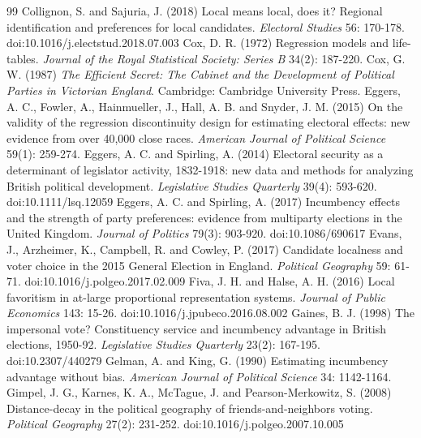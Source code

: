 \documentclass[11pt,a4paper]{article}
\begin{document}
\begin{thebibliography}{99}
 Collignon, S. and Sajuria, J. (2018) Local means local, does it? Regional identification and preferences for local candidates. \textit{Electoral Studies} 56: 170-178. doi:10.1016/j.electstud.2018.07.003
 Cox, D. R. (1972) Regression models and life-tables. \textit{Journal of the Royal Statistical Society: Series B} 34(2): 187-220.
 Cox, G. W. (1987) \textit{The Efficient Secret: The Cabinet and the Development of Political Parties in Victorian England}. Cambridge: Cambridge University Press.
 Eggers, A. C., Fowler, A., Hainmueller, J., Hall, A. B. and Snyder, J. M. (2015) On the validity of the regression discontinuity design for estimating electoral effects: new evidence from over 40,000 close races. \textit{American Journal of Political Science} 59(1): 259-274.
 Eggers, A. C. and Spirling, A. (2014) Electoral security as a determinant of legislator activity, 1832-1918: new data and methods for analyzing British political development. \textit{Legislative Studies Quarterly} 39(4): 593-620. doi:10.1111/lsq.12059
 Eggers, A. C. and Spirling, A. (2017) Incumbency effects and the strength of party preferences: evidence from multiparty elections in the United Kingdom. \textit{Journal of Politics} 79(3): 903-920. doi:10.1086/690617
 Evans, J., Arzheimer, K., Campbell, R. and Cowley, P. (2017) Candidate localness and voter choice in the 2015 General Election in England. \textit{Political Geography} 59: 61-71. doi:10.1016/j.polgeo.2017.02.009
 Fiva, J. H. and Halse, A. H. (2016) Local favoritism in at-large proportional representation systems. \textit{Journal of Public Economics} 143: 15-26. doi:10.1016/j.jpubeco.2016.08.002
 Gaines, B. J. (1998) The impersonal vote? Constituency service and incumbency advantage in British elections, 1950-92. \textit{Legislative Studies Quarterly} 23(2): 167-195. doi:10.2307/440279
 Gelman, A. and King, G. (1990) Estimating incumbency advantage without bias. \textit{American Journal of Political Science} 34: 1142-1164.
 Gimpel, J. G., Karnes, K. A., McTague, J. and Pearson-Merkowitz, S. (2008) Distance-decay in the political geography of friends-and-neighbors voting. \textit{Political Geography} 27(2): 231-252. doi:10.1016/j.polgeo.2007.10.005

\end{thebibliography}
\end{document}
